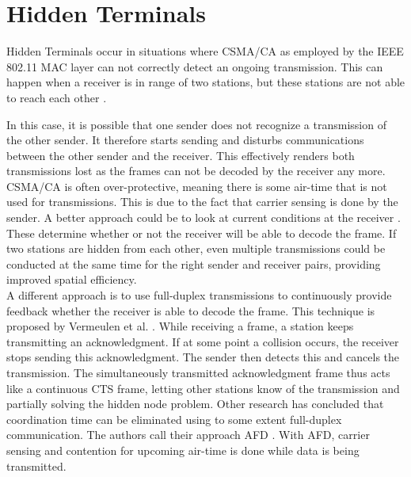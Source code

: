 
\section{Hidden Terminals}

Hidden Terminals occur in situations where \gls{CSMA/CA} as employed by the IEEE 802.11 \gls{MAC} layer can not correctly detect an ongoing transmission. This can happen when a receiver is in range of two stations, but these stations are not able to reach each other \cite{perahia2013}.

In this case, it is possible that one sender does not recognize a transmission of the other sender. It therefore starts sending and disturbs communications between the other sender and the receiver. This effectively renders both transmissions lost as the frames can not be decoded by the receiver any more.\\

\gls{CSMA/CA} is often over-protective, meaning there is some air-time that is not used for transmissions. This is due to the fact that carrier sensing is done by the sender. A better approach could be to look at current conditions at the receiver \cite{halperin2007}. These determine whether or not the receiver will be able to decode the frame. If two stations are hidden from each other, even multiple transmissions could be conducted at the same time for the right sender and receiver pairs, providing improved spatial efficiency.\\

A different approach is to use full-duplex transmissions to continuously provide feedback whether the receiver is able to decode the frame. This technique is proposed by Vermeulen et al. \cite{vermeulen2016}. While receiving a frame, a station keeps transmitting an acknowledgment. If at some point a collision occurs, the receiver stops sending this acknowledgment. The sender then detects this and cancels the transmission. The simultaneously transmitted acknowledgment frame thus acts like a continuous CTS frame, letting other stations know of the transmission and partially solving the hidden node problem. Other research has concluded that coordination time can be eliminated using to some extent full-duplex communication. The authors call their approach \gls{AFD} \cite{lv2014}. With \gls{AFD}, carrier sensing and contention for upcoming air-time is done while data is being transmitted.


